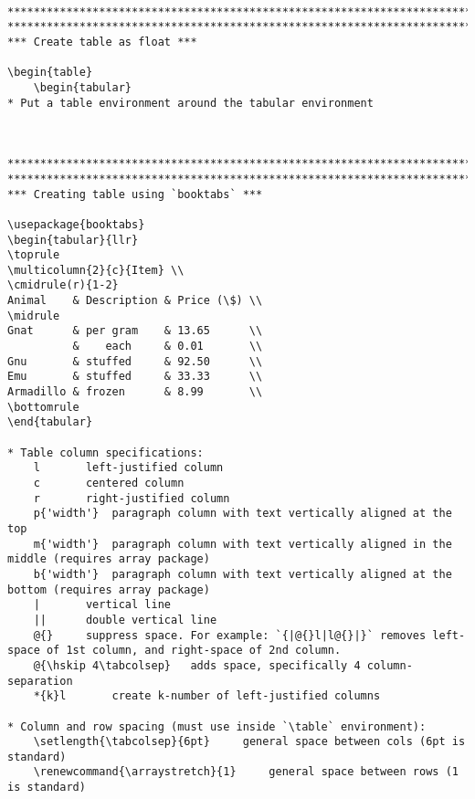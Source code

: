 \documentclass{article}
\begin{document}
\begin{lstlisting}[language={[LaTeX]TeX}, caption={Alternative short names.}]

*********************************************************************************************
*********************************************************************************************
*** Create table as float ***

\begin{table}
    \begin{tabular}
* Put a table environment around the tabular environment



*********************************************************************************************
*********************************************************************************************
*** Creating table using `booktabs` ***

\usepackage{booktabs}
\begin{tabular}{llr}  
\toprule
\multicolumn{2}{c}{Item} \\
\cmidrule(r){1-2}
Animal    & Description & Price (\$) \\
\midrule
Gnat      & per gram    & 13.65      \\
          &    each     & 0.01       \\
Gnu       & stuffed     & 92.50      \\
Emu       & stuffed     & 33.33      \\
Armadillo & frozen      & 8.99       \\
\bottomrule
\end{tabular}

* Table column specifications:
	l		left-justified column
	c		centered column
	r		right-justified column
	p{'width'}	paragraph column with text vertically aligned at the top
	m{'width'}	paragraph column with text vertically aligned in the middle (requires array package)
	b{'width'}	paragraph column with text vertically aligned at the bottom (requires array package)
	|		vertical line
	||		double vertical line
	@{}		suppress space. For example: `{|@{}l|l@{}|}` removes left-space of 1st column, and right-space of 2nd column.
	@{\hskip 4\tabcolsep}	adds space, specifically 4 column-separation
	*{k}l		create k-number of left-justified columns

* Column and row spacing (must use inside `\table` environment):
	\setlength{\tabcolsep}{6pt}		general space between cols (6pt is standard)
	\renewcommand{\arraystretch}{1}		general space between rows (1 is standard)


\end{lstlisting}
\end{document}
